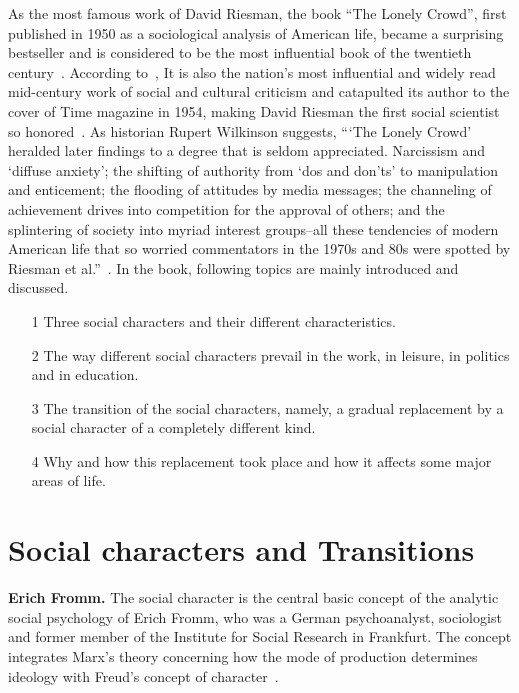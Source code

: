 As the most famous work of David Riesman, the book ``The Lonely Crowd'', first published in 1950 as a sociological analysis of American life, became a surprising bestseller and is considered to be the most influential book of the twentieth century~\citep{riesman1979making}. According to~\citeauthor{horowitz2010david}, It is also the nation’s most influential and widely read mid-century work of social and cultural criticism and catapulted its author to the cover of Time magazine in 1954, making David Riesman the first social scientist so honored~\citep{horowitz2010david}. As historian
Rupert Wilkinson suggests, ```The Lonely Crowd' heralded later findings to a degree that is seldom appreciated. Narcissism
and `diffuse anxiety'; the shifting of authority from `dos and don'ts' to manipulation and enticement; the flooding of attitudes by media messages; the channeling of achievement drives into competition for the approval of others; and the splintering of society into myriad interest groups--all these tendencies of modern American life that so worried commentators in the 1970s and 80s were spotted by Riesman et al.''~\citep{wilkinson1988pursuit}. In the book, following topics are mainly introduced and discussed.
\begin{itemize}
\item[1] Three social characters and their different characteristics.%
\item[2] The way different social characters prevail in the work, in leisure, in politics and in education. %
\item[3] The transition of the social characters, namely, a gradual replacement by a social character of a completely different kind.%
\item[4] Why and how this replacement took place and how it affects some major areas of life.
\end{itemize}
 
\section{Social characters and Transitions}\label{chp.background.characters}  

\textbf{Erich Fromm.}
The social character is the central basic concept of the analytic social psychology of Erich Fromm, who was a German psychoanalyst, sociologist and former member of the Institute for
Social Research in Frankfurt. The concept integrates Marx's theory concerning how the mode of production determines ideology with Freud's concept of character~\citep{fromm1941escape}.

